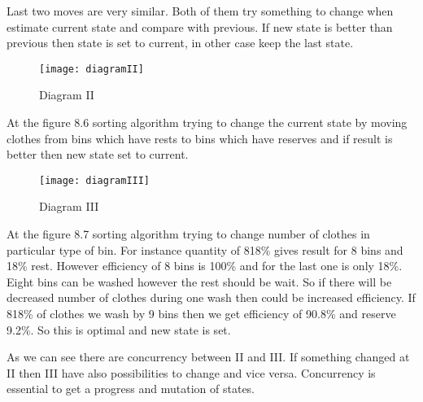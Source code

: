 Last two moves are very similar. Both of them try something to change when estimate current state and compare with previous. If new state is better than previous then state is set to current, in other case keep the last state.  \newpage

\begin{figure}[h]
	\centering
		\texttt{[image: diagramII]}
	\caption{Diagram II}
	\label{fig:planning}
\end{figure}

At the figure 8.6 sorting algorithm trying to change the current state by moving clothes from bins which have rests to bins which have reserves and if result is better then new state set to current. 

\begin{figure}[h]
	\centering
		\texttt{[image: diagramIII]}
	\caption{Diagram III}
	\label{fig:planning}
\end{figure}

At the figure 8.7 sorting algorithm trying to change number of clothes in particular type of bin. For instance quantity of 818\% gives result for 8 bins and 18\% rest. However efficiency of 8 bins is 100\% and for the last one is only 18\%. Eight bins can be washed however the rest should be wait. So if there will be decreased number of clothes during one wash then could be increased efficiency. If 818\% of clothes we wash by 9 bins then we get efficiency of 90.8\% and reserve 9.2\%. So this is optimal and new state is set.

As we can see there are concurrency between II and III. If something changed at II then III have also possibilities to change and vice versa. Concurrency is essential to get a progress and mutation of states.